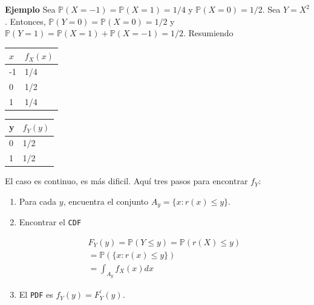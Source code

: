 \documentclass{article}\usepackage[]{graphicx}\usepackage[]{color}
\begin{document}
\vspace{0.3cm}

\textbf{Ejemplo} Sea $\mathbb{P}(X = -1) = \mathbb{P}(X = 1) = 1/4$ y $\mathbb{P}(X = 0) = 1/2$. Sea $Y = X^2$. Entonces, $\mathbb{P}(Y = 0) = \mathbb{P}(X = 0) = 1/2$ y $\mathbb{P}(Y = 1) = \mathbb{P}(X = 1) + \mathbb{P}(X = -1) = 1/2$. Resumiendo


\vspace{0.5cm}



\begin{minipage}{2.5in}
\centering
\begin{tabular}{l l }
$x$ & $f_{X}(x)$ \\
\hline
-1     & 1/4   \\                     
0     & 1/2   \\                
1     & 1/4                        
\end{tabular}
\end{minipage}
\begin{minipage}{2.5in}
\centering
\begin{tabular}{l l}
y & $f_Y(y)$ \\
\hline
0 & 1/2                 \\
1 & 1/2                 
\end{tabular}
\end{minipage}

\vspace{0.5cm}


El caso es continuo, es m\'as dificil. Aqu\'i tres pasos para encontrar $f_Y$:

\vspace{0.3cm}

\begin{enumerate}
\item Para cada $y$, encuentra el conjunto $A_y =  \{x: r(x) \leq y \}$.
\item Encontrar el \texttt{CDF}

\begin{align*}
F_{Y}(y) = \mathbb{P}(Y \leq y) = \mathbb{P}(r(X) \leq y)\\
   = \mathbb{P}(\{x : r(x) \leq y \})\\
   = \int_{A_y}f_{X}(x)dx 
\end{align*}
\item El \texttt{PDF} es $f_{Y}(y) = F_{Y}^{'}(y)$.
\end{enumerate}
\end{document}
